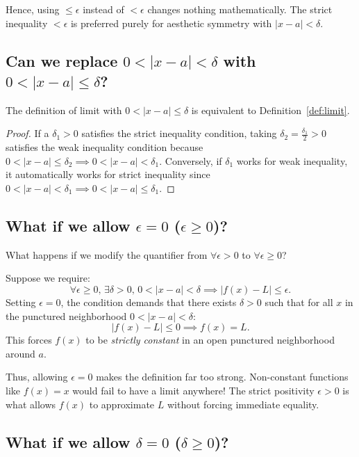 \documentclass{essay}
\begin{document}
Hence, using \(\le \epsilon\) instead of \(< \epsilon\) changes nothing mathematically. The strict inequality \(< \epsilon\) is preferred purely for aesthetic symmetry with \(|x - a| < \delta\).

\subsection{Can we replace \(0 < |x - a| < \delta\) with \(0 < |x - a| \le \delta\)?}

\begin{theorem}
  The definition of limit with \(0 < |x - a| \le \delta\) is equivalent to Definition~\ref{def:limit}.
\end{theorem}

\begin{proof}
  If a \(\delta_{1} > 0\) satisfies the strict inequality condition, taking \(\delta_{2} = \frac{\delta_{1}}{2} > 0\) satisfies the weak inequality condition because \(0 < |x - a| \le \delta_{2} \implies 0 < |x - a| < \delta_{1}\). Conversely, if \(\delta_{1}\) works for weak inequality, it automatically works for strict inequality since \(0 < |x - a| < \delta_{1} \implies 0 < |x - a| \le \delta_{1}\).
\end{proof}

\subsection{What if we allow \(\epsilon = 0\) (\(\epsilon \ge 0\))?}

What happens if we modify the quantifier from \(\forall \epsilon > 0\) to \(\forall \epsilon \ge 0\)?

Suppose we require:
\[ \forall \epsilon \ge 0, \, \exists \delta > 0, \, 0 < |x - a| < \delta \implies |f(x) - L| \le \epsilon. \]
Setting \(\epsilon = 0\), the condition demands that there exists \(\delta > 0\) such that for all \(x\) in the punctured neighborhood \(0 < |x - a| < \delta\):
\[ |f(x) - L| \le 0 \implies f(x) = L. \]
This forces \(f(x)\) to be \emph{strictly constant} in an open punctured neighborhood around \(a\).

Thus, allowing \(\epsilon = 0\) makes the definition far too strong. Non-constant functions like \(f(x) = x\) would fail to have a limit anywhere! The strict positivity \(\epsilon > 0\) is what allows \(f(x)\) to approximate \(L\) without forcing immediate equality.

\subsection{What if we allow \(\delta = 0\) (\(\delta \ge 0\))?}
\end{document}
